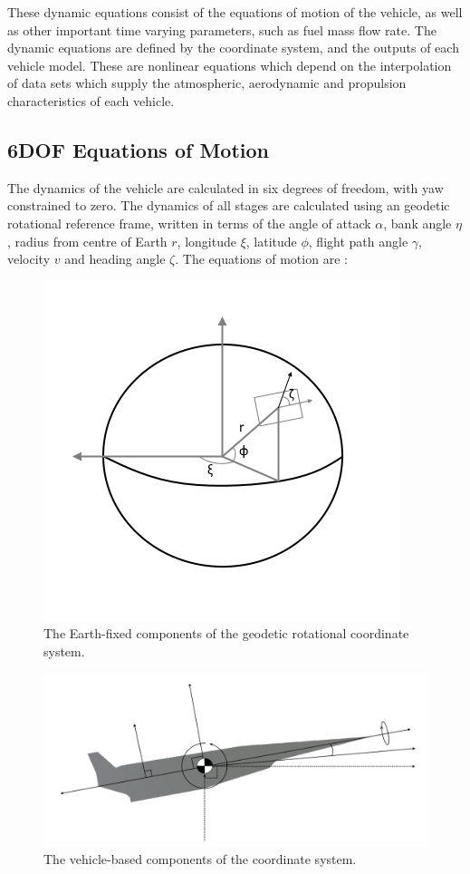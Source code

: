 These dynamic equations consist of the equations of motion of the vehicle, as well as other important time varying parameters, such as fuel mass flow rate. 
The dynamic equations are defined by the coordinate system, and the outputs of each vehicle model. These are nonlinear equations which depend on the interpolation of data sets which supply the atmospheric, aerodynamic and propulsion characteristics of each vehicle. 




\subsection{6DOF Equations of Motion}


The dynamics of the vehicle are calculated in six degrees of freedom, with yaw constrained to zero. 
The dynamics of all stages are calculated using an geodetic rotational reference frame, written in terms of the angle of attack $\alpha$, bank angle $\eta$, radius from centre of Earth $r$, longitude $\xi$, latitude $\phi$, flight path angle $\gamma$, velocity $v$ and heading angle $\zeta$. The equations of motion are \cite{Josselyn2002a}:
\begin{figure}[ht]
	\centering
	\includegraphics[width=0.7\linewidth]{figures/4_LODESTAR/global}
	\caption{The Earth-fixed components of the geodetic rotational coordinate system.}
	\label{fig:global}
\end{figure}
\begin{figure}[ht]
	\centering
	\includegraphics[width=0.9\linewidth]{figures/4_LODESTAR/Axes}
	\caption{The vehicle-based components of the coordinate system.}
	\label{fig:Axes}
\end{figure}


